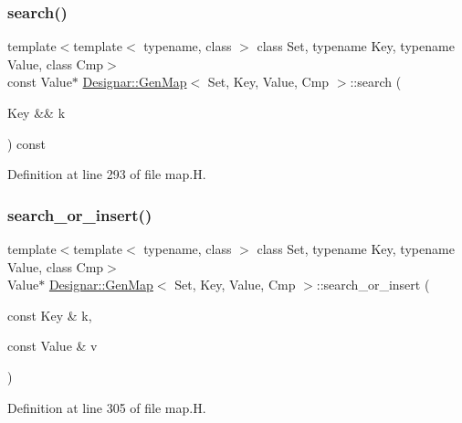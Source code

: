 \subsubsection{\texorpdfstring{search()}{search()}\hspace{0.1cm}{\footnotesize\ttfamily [4/4]}}
{\footnotesize\ttfamily template$<$template$<$ typename, class $>$ class Set, typename Key, typename Value, class Cmp$>$ \\
const Value$\ast$ \hyperlink{class_designar_1_1_gen_map}{Designar\+::\+Gen\+Map}$<$ Set, Key, Value, Cmp $>$\+::search (\begin{DoxyParamCaption}\item[{Key \&\&}]{k }\end{DoxyParamCaption}) const\hspace{0.3cm}{\ttfamily [inline]}}



Definition at line 293 of file map.\+H.

\mbox{\label{class_designar_1_1_gen_map_a204d7e2d2d8d97cec886e60f4d4d22ec}} 
\subsubsection{\texorpdfstring{search\+\_\+or\+\_\+insert()}{search\_or\_insert()}\hspace{0.1cm}{\footnotesize\ttfamily [1/6]}}
{\footnotesize\ttfamily template$<$template$<$ typename, class $>$ class Set, typename Key, typename Value, class Cmp$>$ \\
Value$\ast$ \hyperlink{class_designar_1_1_gen_map}{Designar\+::\+Gen\+Map}$<$ Set, Key, Value, Cmp $>$\+::search\+\_\+or\+\_\+insert (\begin{DoxyParamCaption}\item[{const Key \&}]{k,  }\item[{const Value \&}]{v }\end{DoxyParamCaption})\hspace{0.3cm}{\ttfamily [inline]}}



Definition at line 305 of file map.\+H.

\mbox{\label{class_designar_1_1_gen_map_a12c2b26187291c9553ff36e8c00bce4b}} 
